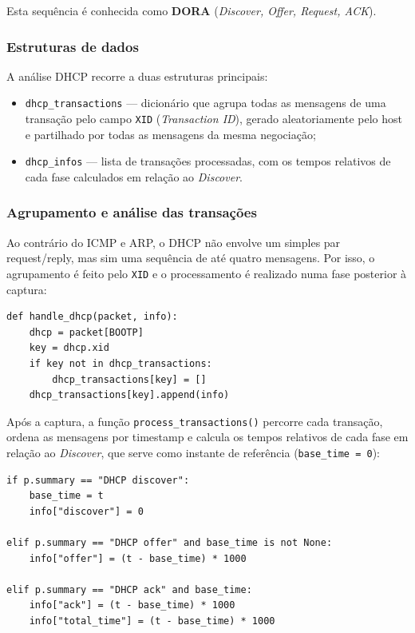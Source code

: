 \documentclass[a4paper,12pt]{article}
\begin{document}
Esta sequência é conhecida como \textbf{DORA} (\textit{Discover, Offer, Request, ACK}).

\subsubsection{Estruturas de dados}

A análise DHCP recorre a duas estruturas principais:

\begin{itemize}
    \item \texttt{dhcp\_transactions} — dicionário que agrupa todas as mensagens de uma transação pelo campo \texttt{XID} (\textit{Transaction ID}), gerado aleatoriamente pelo host e partilhado por todas as mensagens da mesma negociação;
    \item \texttt{dhcp\_infos} — lista de transações processadas, com os tempos relativos de cada fase calculados em relação ao \textit{Discover}.
\end{itemize}

\subsubsection{Agrupamento e análise das transações}

Ao contrário do ICMP e ARP, o DHCP não envolve um simples par request/reply, mas sim
uma sequência de até quatro mensagens. Por isso, o agrupamento é feito pelo \texttt{XID}
e o processamento é realizado numa fase posterior à captura:

\vspace{0.5em}

\begin{lstlisting}[style=python]
def handle_dhcp(packet, info):
    dhcp = packet[BOOTP]
    key = dhcp.xid
    if key not in dhcp_transactions:
        dhcp_transactions[key] = []
    dhcp_transactions[key].append(info)
\end{lstlisting}

Após a captura, a função \texttt{process\_transactions()} percorre cada transação, ordena
as mensagens por timestamp e calcula os tempos relativos de cada fase em relação ao
\textit{Discover}, que serve como instante de referência (\texttt{base\_time = 0}):

\vspace{0.5em}

\begin{lstlisting}[style=python]
if p.summary == "DHCP discover":
    base_time = t
    info["discover"] = 0

elif p.summary == "DHCP offer" and base_time is not None:
    info["offer"] = (t - base_time) * 1000

elif p.summary == "DHCP ack" and base_time:
    info["ack"] = (t - base_time) * 1000
    info["total_time"] = (t - base_time) * 1000
\end{lstlisting}
\end{document}
